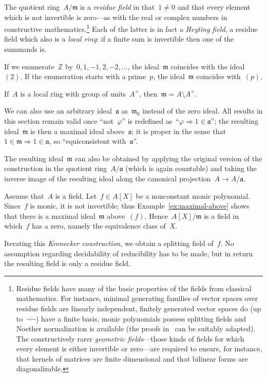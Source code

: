 \documentclass[envcountsect,envcountsame,runningheads]{llncs}
\newcommand{\aaa}{\mathfrak{a}}
\newcommand{\mmm}{\mathfrak{m}}
\newcommand{\ZZ}{\mathbb{Z}}
\renewcommand{\_}{\mathpunct{.}\,}
\begin{document}
The quotient ring~$A/\mmm$ is a \emph{residue field} in that~$1 \neq 0$
and that every element which is not invertible is zero---as with the real or
complex numbers in constructive mathematics.\footnote{Residue fields have
many of the basic properties of the fields from classical mathematics. For
instance, minimal generating families of vector spaces over residue fields are
linearly independent, finitely generated vector spaces do (up to~$\neg\neg$) have
a finite basis, monic polynomials possess splitting fields and Noether
normalization is available (the proofs
in~\cite{mines-richman-ruitenburg:constructive-algebra} can be suitably
adapted). The constructively rarer \emph{geometric fields}---those kinds of
fields for which every element is either invertible or zero---are required to
ensure, for instance, that kernels of matrices are finite dimensional and that bilinear forms
are diagonalizable.}
Each of the latter is in fact a \emph{Heyting field},
a residue field which also is a \emph{local ring}: if a finite
sum is invertible then one of the summands is.

\begin{example}If we enumerate~$\ZZ$ by~$0,1,-1,2,-2,\ldots$, the
ideal~$\mmm$ coincides with the ideal~$(2)$. If the enumeration starts with a
prime~$p$, the ideal~$\mmm$ coincides with~$(p)$.\end{example}

\begin{example}If~$A$ is a local ring with group of units~$A^\times$, then~$\mmm = A \setminus A^\times$.\end{example}

\begin{example}\label{ex:maximal-above}We can also use an
arbitrary ideal~$\aaa$ as~$\mmm_0$ instead of the zero ideal. All results in
this section remain valid once ``not~$\varphi$'' is redefined
as~``$\varphi \Rightarrow 1\in\aaa$''; the resulting ideal~$\mmm$ is then a
maximal ideal above~$\aaa$; it is proper in the sense that~$1 \in \mmm
\Rightarrow 1 \in \aaa$, so ``equiconsistent with~$\aaa$''.

The resulting ideal~$\mmm$ can also be obtained by applying the original
version of the construction in the quotient ring~$A/\aaa$ (which is again
countable) and taking the inverse image of the resulting ideal along the
canonical projection~$A \to A/\aaa$.\end{example}

\begin{example}Assume that~$A$ is a field. Let~$f \in A[X]$ be a nonconstant monic
polynomial. Since~$f$ is monic, it is not invertible; thus
Example~\ref{ex:maximal-above} shows that there is a maximal ideal~$\mmm$
above~$(f)$. Hence~$A[X]/\mmm$ is a field in which~$f$ has a zero, namely the equivalence class of~$X$.

Iterating this \emph{Kronecker construction}, we obtain a splitting field of~$f$. No
assumption regarding decidability of reducibility has to be made, but in return
the resulting field is only a residue field.\end{example}
\end{document}
